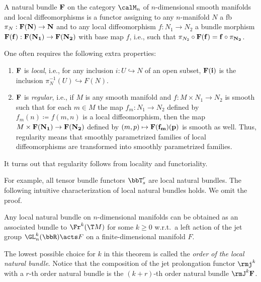\begin{defn}\label{def natural bundle}
    A natural bundle $\bf{F}$ on the category $\calM_n$ of $n$-dimensional smooth manifolds and local diffeomorphisms is a functor assigning to any $n$-manifold $N$ a \gls{fb} $\pi_N:\bf{F}(N)\to N$ and to any local diffeomorphism $f:N_1\to N_2$ a bundle morphism $\bf{F}(f):\bf{F}(N_1)\to \bf{F}(N_2)$ with base map $f$, i.e., such that $\pi_{N_2}\circ \bf{F}(f)=f\circ \pi_{N_2}$. 

    One often requires the following extra properties:
    \begin{enumerate}[label=(\alph*)]
        \item $\bf{F}$ is \emph{local}, i.e., for any inclusion $i:U\hookrightarrow N$ of an open subset, $\bf{F}(i)$ is the inclusion $\pi^{-1}_N(U)\hookrightarrow F(N)$.
    
        \item $\bf{F}$ is \emph{regular}, i.e., if $M$ is any smooth manifold and $f:M\times N_1\to N_2$ is smooth such that for each $m\in M$ the map $f_m:N_1\to N_2$ defined by $f_m(n)\coloneqq f(m,n)$ is a local diffeomorphism, then the map $M\times \bf{F}(N_1)\to F(N_2)$ defined by $(m,p)\mapsto \bf{F}(f_m)(p)$ is smooth as well. Thus, regularity means that smoothly parametrized families of local diffeomorphisms are transformed into smoothly parametrized families.
    \end{enumerate}
    It turns out that regularity follows from locality and functoriality.
\end{defn}

For example, all tensor bundle functors $\bbT^r_s$ are local natural bundles. The following intuitive characterization of local natural bundles holds. We omit the proof.

\begin{thm}
    Any local natural bundle on $n$-dimensional manifolds can be obtained as an associated bundle to $\Fr^k (\T M)$ for some $k\geq 0$ w.r.t.\ a left action of the jet group $\GL^k_n(\bbR)\acts F$ on a finite-dimensional manifold $F$.
\end{thm}

The lowest possible choice for $k$ in this theorem is called the \emph{order of the local natural bundle}. Notice that the composition of the jet prolongation functor $\rmj^k$ with a $r$-th order natural bundle is the $(k+r)$-th order natural bundle $\rmJ^k \bf{F}$.




